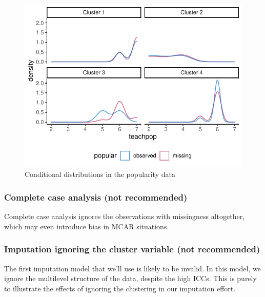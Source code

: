 \documentclass[
]{jss}
\begin{document}
\begin{CodeChunk}
\begin{figure}

{\centering \includegraphics{Manuscript_files/figure-latex/pop_dist-1} 

}

\caption[Conditional distributions in the popularity data]{Conditional distributions in the popularity data}\label{fig:pop_dist}
\end{figure}
\end{CodeChunk}

\hypertarget{complete-case-analysis-not-recommended}{%
\subsubsection{Complete case analysis (not
recommended)}\label{complete-case-analysis-not-recommended}}

Complete case analysis ignores the observations with missingness
altogether, which may even introduce bias in MCAR situations.

\hypertarget{imputation-ignoring-the-cluster-variable-not-recommended}{%
\subsubsection{Imputation ignoring the cluster variable (not
recommended)}\label{imputation-ignoring-the-cluster-variable-not-recommended}}

The first imputation model that we'll use is likely to be invalid. In
this model, we ignore the multilevel structure of the data, despite the
high ICCs. This is purely to illustrate the effects of ignoring the
clustering in our imputation effort.
\end{document}
